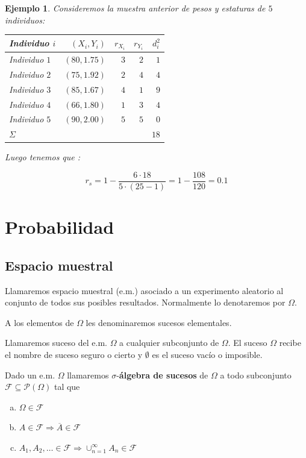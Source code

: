 \documentclass[12pt]{report}
\newtheorem{example}[definition]{Ejemplo}
\begin{document}
\begin{example}
Consideremos la muestra anterior de pesos y estaturas de $5$ individuos:

\begin{center}
\begin{tabular}{l|r|r|r|r|}
 Individuo $i$ & $(X_i,Y_i)$ &  $r_{X_i}$ &$r_{Y_i}$ & $d^2_i$ \\\hline
 Individuo $1$ & $(80,1.75)$ & $3$ & $2$ & $1$\\
 Individuo $2$ & $(75,1.92)$ & $2$ & $4$ & $4$\\
 Individuo $3$ & $(85,1.67)$ & $4$ & $1$ & $9$\\
 Individuo $4$ & $(66,1.80)$ & $1$ & $3$ & $4$\\
 Individuo $5$ & $(90,2.00)$ & $5$ & $5$ & $0$\\\hline
 $\Sigma$ & & & & $18$
\end{tabular}
\end{center}


Luego tenemos que :

$$
r_s = 1 -  \frac{6\cdot 18}{5\cdot (25-1)}= 1-\frac{108}{120}= 0.1
$$

\end{example}
\chapter{Probabilidad}

     \section{Espacio muestral}

     Llamaremos espacio muestral (e.m.) asociado a un experimento aleatorio
     al conjunto de todos sus posibles resultados. Normalmente lo
     denotaremos por $\Omega$.

     A los elementos de $\Omega$ les
     denominaremos sucesos elementales.

     Llamaremos suceso del e.m. $\Omega$ a cualquier
     subconjunto de $\Omega$. El suceso $\Omega$ recibe el nombre de
     suceso seguro o cierto y $\emptyset$ es el suceso vacío o imposible.



     Dado un e.m. $\Omega$ llamaremos $\sigma$-\textbf{álgebra de sucesos }
     de $\Omega$ a todo subconjunto $\mathcal{F}\subseteq\mathcal{P}(\Omega)$
     tal que
     \begin{enumerate}[a)]
     \item $\Omega\in\mathcal{F}$
     \item $A\in \mathcal{F} \Longrightarrow \overline{A}\in\mathcal{F}$
     \item $A_{1},A_{2},\ldots\in\mathcal{F}\Longrightarrow
     \displaystyle{\cup_{n=1}^{\infty}} A_{n}\in\mathcal{F}$
     \end{enumerate}
\end{document}
